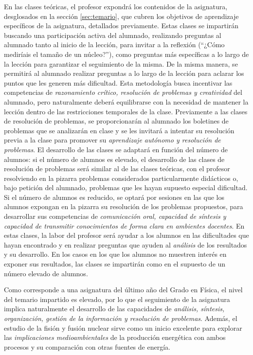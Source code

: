 \documentclass[a4paper,12pt,twoside]{article}
\begin{document}
En las clases teóricas, el profesor expondrá los contenidos de la asignatura, desglosados en la sección \ref{sec:temario}, que cubren los objetivos de aprendizaje específicos de la asignatura, detallados previamente. Estas clases se impartirán buscando una participación activa del alumnado, realizando preguntas al alumnado tanto al inicio de la lección, para invitar a la reflexión (``¿Cómo mediríais el tamaño de un núcleo?''), como preguntas más específicas a lo largo de la lección para garantizar el seguimiento de la misma. De la misma manera, se permitirá al alumnado realizar preguntas a lo largo de la lección para aclarar los puntos que les generen más dificultad. Esta metodología busca incentivar las competencias de \textit{razonamiento crítico, resolución de problemas y creatividad} del alumnado, pero naturalmente deberá equilibrarse con la necesidad de mantener la lección dentro de las restricciones temporales de la clase. Previamente a las clases de resolución de problemas, se proporcionarán al alumnado los boletines de problemas que se analizarán en clase y se les invitará a intentar su resolución previa a la clase para promover su \textit{aprendizaje autónomo y resolución de problemas}. El desarrollo de las clases se adaptará en función del número de alumnos: si el número de alumnos es elevado, el desarrollo de las clases de resolución de problemas será similar al de las clases teóricas, con el profesor resolviendo en la pizarra problemas considerados particularmente didácticos o, bajo petición del alumnado, problemas que les hayan supuesto especial dificultad. Si el número de alumnos es reducido, se optará por sesiones en las que los alumnos expongan en la pizarra su resolución de los problemas propuestos, para desarrollar sus competencias de \textit{comunicación oral, capacidad de síntesis y capacidad de transmitir conocimientos de forma clara en ambientes docentes}. En estas clases, la labor del profesor será ayudar a los alumnos en las dificultades que hayan encontrado y en realizar preguntas que ayuden al \textit{análisis} de los resultados y su desarrollo. En los casos en los que los alumnos no muestren interés en exponer sus resultados, las clases se impartirán como en el supuesto de un número elevado de alumnos.

Como corresponde a una asignatura del último año del Grado en Física, el nivel del temario impartido es elevado, por lo que el seguimiento de la asignatura implica naturalmente el desarrollo de las capacidades de \textit{análisis, síntesis, organización, gestión de la información y resolución de problemas}. Además, el estudio de la fisión y fusión nuclear sirve como un inicio excelente para explorar las \textit{implicaciones medioambientales} de la producción energética con ambos procesos y su comparación con otras fuentes de energía.
\end{document}
